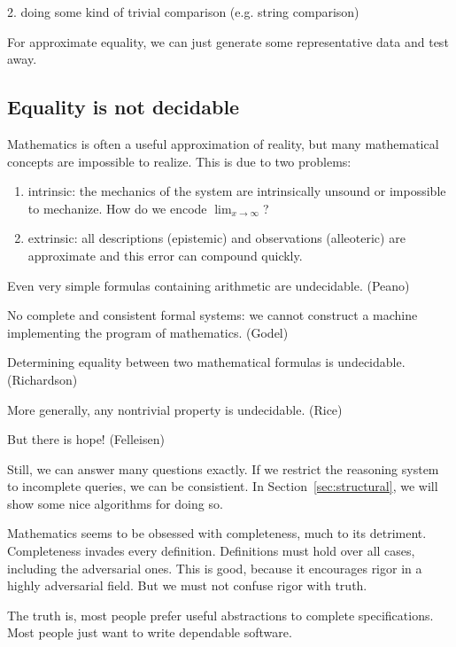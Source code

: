\documentclass[11pt]{article}
\begin{document}
    2. doing some kind of trivial comparison (e.g. string comparison)

    For approximate equality, we can just generate some representative data and test away.

    \subsection{Equality is not decidable}

    Mathematics is often a useful approximation of reality, but many mathematical concepts are impossible to realize. This is due to two problems:

    \begin{enumerate}
        \item intrinsic: the mechanics of the system are intrinsically unsound or impossible to mechanize. How do we encode $\lim_{x \rightarrow \infty}$?
        \item extrinsic: all descriptions (epistemic) and observations (alleoteric) are approximate and this error can compound quickly.
    \end{enumerate}

    Even very simple formulas containing arithmetic are undecidable. (Peano)

    No complete and consistent formal systems: we cannot construct a machine implementing the program of mathematics. (Godel)

    Determining equality between two mathematical formulas is undecidable. (Richardson)

    More generally, any nontrivial property is undecidable. (Rice)

    But there is hope! (Felleisen)


    Still, we can answer many questions exactly. If we restrict the reasoning system to incomplete queries, we can be consistient. In Section~\ref{sec:structural}, we will show some nice algorithms for doing so.

    Mathematics seems to be obsessed with completeness, much to its detriment. Completeness invades every definition. Definitions must hold over all cases, including the adversarial ones. This is good, because it encourages rigor in a highly adversarial field. But we must not confuse rigor with truth.

    The truth is, most people prefer useful abstractions to complete specifications. Most people just want to write dependable software.
\end{document}
